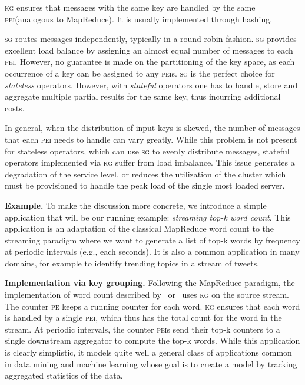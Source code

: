 \documentclass[10pt,conference,letterpaper]{IEEEtran}
\newcommand{\spara}[1]{\smallskip\noindent\textbf{#1}}
\newcommand{\pei}{\textsc{pei}\xspace}
\newcommand{\peis}{{\pei}s\xspace}
\newcommand{\pe}{\textsc{pe}\xspace}
\newcommand{\kg}{\textsc{kg}\xspace}
\newcommand{\sg}{\textsc{sg}\xspace}
\begin{document}
\kg ensures that messages with the same key are handled by the same \pei (analogous to MapReduce).
It is usually implemented through hashing. 

\sg routes messages independently, typically in a round-robin fashion.
\sg provides excellent load balance by assigning an almost equal number of messages to each \pei.
However, no guarantee is made on the partitioning of the key space, as each occurrence of a key can be assigned to any \peis.
\sg is the perfect choice for \emph{stateless} operators.
However, with \emph{stateful} operators one has to handle, store and aggregate multiple partial results for the same key, thus incurring additional costs. 




In general, when the distribution of input keys is skewed, the number of messages that each \pei needs to handle can vary greatly.
While this problem is not present for stateless operators, which can use \sg to evenly distribute messages, stateful operators implemented via \kg suffer from load imbalance.
This issue generates a degradation of the service level, or reduces the utilization of the cluster which must be provisioned to handle the peak load of the single most loaded server.




\spara{Example.}
To make the discussion more concrete, we introduce a simple application that will be our running example: \emph{streaming top-k word count}.
This application is an adaptation of the classical MapReduce word count to the streaming paradigm where we want to generate a list of top-k words by frequency at periodic intervals (e.g., each  seconds).
It is also a common application in many domains, for example to identify trending topics in a stream of tweets.

\spara{Implementation via key grouping.} Following the MapReduce paradigm, the implementation of word count described by~\citet{neumeyer2010s4} or~\citet{noll2013rolling} uses \kg on the source stream.
The counter \pe keeps a running counter for each word.
\kg ensures that each word is handled by a single \pei, which thus has the total count for the word in the stream.
At periodic intervals, the counter \peis send their top-k counters to a single downstream aggregator to compute the top-k words.
While this application is clearly simplistic, it models quite well a general class of applications common in data mining and machine learning whose goal is to create a model by tracking aggregated statistics of the data.
\end{document}
